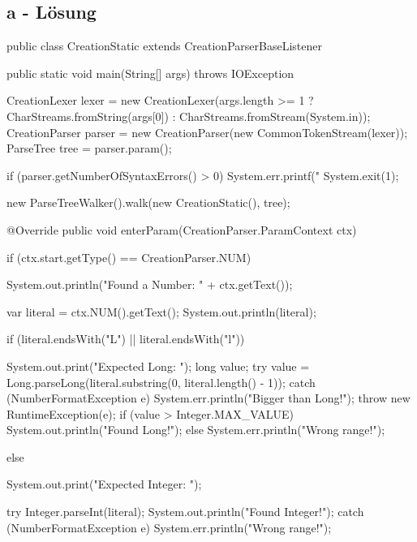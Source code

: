 \subsection*{a - Lösung}
\newline
\begin{code}[language=java, caption={ParserListener für statische Syntax}, label={lst:Aufgabe3a}]
public class CreationStatic extends CreationParserBaseListener {

    public static void main(String[] args) throws IOException {
        CreationLexer lexer = new CreationLexer(args.length >= 1 ?
        CharStreams.fromString(args[0]) : CharStreams.fromStream(System.in));
        CreationParser parser = new CreationParser(new CommonTokenStream(lexer));
        ParseTree tree = parser.param();

        if (parser.getNumberOfSyntaxErrors() > 0) {
            System.err.printf("%
            System.exit(1);
        }

        new ParseTreeWalker().walk(new CreationStatic(), tree);
    }

    @Override
    public void enterParam(CreationParser.ParamContext ctx) {

        if (ctx.start.getType() == CreationParser.NUM) {
            System.out.println("Found a Number: " + ctx.getText());

            var literal = ctx.NUM().getText();
            System.out.println(literal);

            if (literal.endsWith("L") || literal.endsWith("l")) {
                System.out.print("Expected Long: ");
                long value;
                try {
                    value = Long.parseLong(literal.substring(0, literal.length() - 1));
                } catch (NumberFormatException e) {
                    System.err.println("Bigger than Long!");
                    throw new RuntimeException(e);
                }
                if (value > Integer.MAX_VALUE) {
                    System.out.println("Found Long!");
                } else {
                    System.err.println("Wrong range!");
                }

            } else {
                System.out.print("Expected Integer: ");

                try {
                    Integer.parseInt(literal);
                    System.out.println("Found Integer!");
                } catch (NumberFormatException e) {
                    System.err.println("Wrong range!");
                }
            }
        }
    }
}
\end{code}

